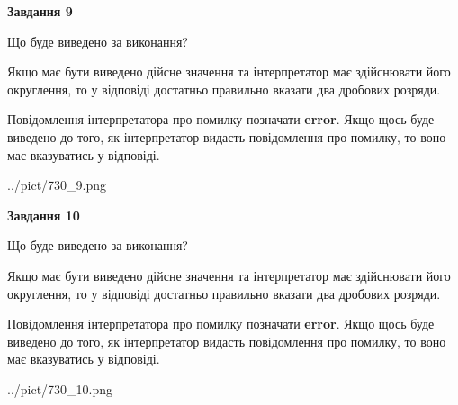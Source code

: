 \documentclass[12pt, ukrainian]{article}
\begin{document}
{\begin {Large}
{\begin {center}\textbf{Завдання 9}\end {center}}\par
Що буде виведено за виконання? \par

Якщо має бути виведено дійсне значення та інтерпретатор має здійснювати його округлення, 
то у відповіді достатньо правильно вказати два дробових розряди.

Повідомлення інтерпретатора про помилку позначати \textbf{error}.
Якщо щось буде виведено до того, як інтерпретатор видасть повідомлення про помилку, 
то воно має вказуватись у відповіді. \par

\begin{center}
	{../pict/730_9.png}
\end{center}
\newpage

{\begin {center}\textbf{Завдання 10}\end {center}}\par
Що буде виведено за виконання? \par

Якщо має бути виведено дійсне значення та інтерпретатор має здійснювати його округлення, 
то у відповіді достатньо правильно вказати два дробових розряди.

Повідомлення інтерпретатора про помилку позначати \textbf{error}.
Якщо щось буде виведено до того, як інтерпретатор видасть повідомлення про помилку, 
то воно має вказуватись у відповіді. \par

\begin{center}
	{../pict/730_10.png}
\end{center}
\newpage

\end {Large}}
\end{document}
